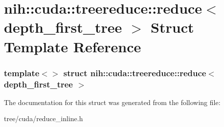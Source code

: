 \hypertarget{structnih_1_1cuda_1_1treereduce_1_1reduce_3_01depth__first__tree_01_4}{
\section{nih\-:\-:cuda\-:\-:treereduce\-:\-:reduce$<$ depth\-\_\-first\-\_\-tree $>$ \-Struct \-Template \-Reference}
\label{structnih_1_1cuda_1_1treereduce_1_1reduce_3_01depth__first__tree_01_4}
}
\subsubsection*{template$<$$>$ struct nih\-::cuda\-::treereduce\-::reduce$<$ depth\-\_\-first\-\_\-tree $>$}



\-The documentation for this struct was generated from the following file\-:\begin{DoxyCompactItemize}
\item 
tree/cuda/reduce\-\_\-inline.\-h\end{DoxyCompactItemize}
